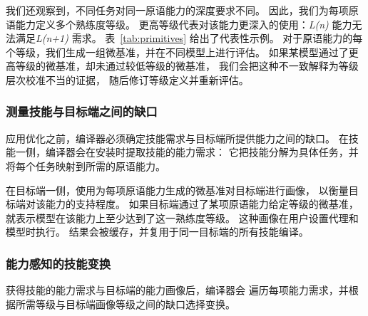 我们还观察到，不同任务对同一原语能力的深度要求不同。
因此，我们为每项原语能力定义多个熟练度等级。
更高等级代表对该能力更深入的使用：\emph{L(n)} 能力无法满足\emph{L(n+1)} 需求。
表~\ref{tab:primitives} 给出了代表性示例。
对于原语能力的每个等级，我们生成一组微基准，并在不同模型上进行评估。
如果某模型通过了更高等级的微基准，却未通过较低等级的微基准，
我们会把这种不一致解释为等级层次校准不当的证据，
随后修订等级定义并重新评估。

\begin{table}[t]
\setlength{\abovecaptionskip}{4pt}
\setlength{\belowcaptionskip}{0pt}
\centering
\caption{代表性原语能力及其熟练度等级。完整目录包含分属四类的 26 项原语能力。}
\label{tab:primitives}
\end{table}

\subsubsection{测量技能与目标端之间的缺口}

应用优化之前，编译器必须确定技能需求与目标端所提供能力之间的缺口。
在技能一侧，编译器会在安装时提取技能的能力需求：
它把技能分解为具体任务，并将每个任务映射到所需的原语能力。

在目标端一侧，\sys 使用为每项原语能力生成的微基准对目标端进行画像，
以衡量目标端对该能力的支持程度。
如果目标端通过了某项原语能力给定等级的微基准，
就表示模型在该能力上至少达到了这一熟练度等级。
这种画像在用户设置代理和模型时执行。
结果会被缓存，并复用于同一目标端的所有技能编译。

\subsubsection{能力感知的技能变换}

获得技能的能力需求与目标端的能力画像后，编译器会
遍历每项能力需求，并根据所需等级与目标端画像等级之间的缺口选择变换。

